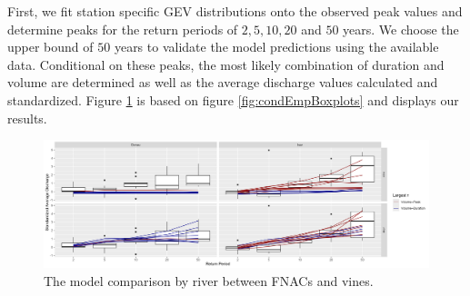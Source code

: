 \documentclass[
]{krantz}
\begin{document}
First, we fit
station specific GEV distributions onto the observed peak values and determine peaks
for the return periods of \(2, 5, 10, 20\) and \(50\) years.
We choose the upper bound of \(50\) years to validate the model predictions using the available data.
Conditional on these peaks, the most likely combination of duration and volume are determined as well as
the average discharge values calculated and standardized.
Figure \ref{fig:modelEval} is based on figure \ref{fig:condEmpBoxplots} and displays our results.

\begin{figure}

{\centering \includegraphics[width=1\linewidth]{work/04-floodfreq/figures/app_modeleval} 

}

\caption{The model comparison by river between FNACs and vines.}\label{fig:modelEval}
\end{figure}
\end{document}
